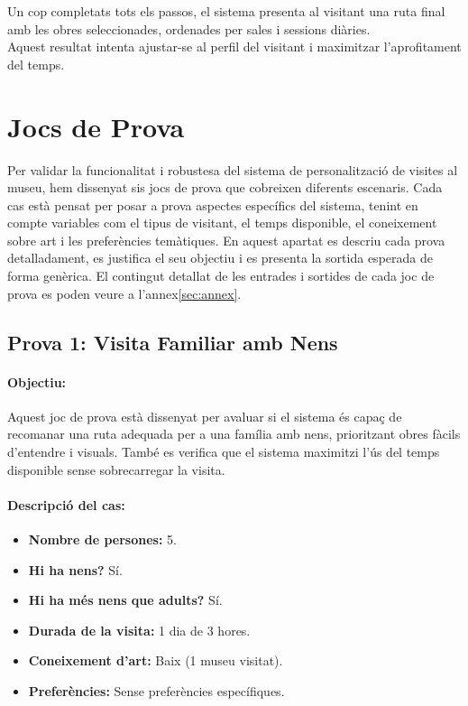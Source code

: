 \documentclass[a4paper]{article}
\begin{document}
	Un cop completats tots els passos, el sistema presenta al visitant una ruta final amb les obres seleccionades, ordenades per sales i sessions diàries. \\
	
	Aquest resultat intenta ajustar-se al perfil del visitant i maximitzar l’aprofitament del temps.
	
	
	\newpage
	\section{Jocs de Prova}
	
	Per validar la funcionalitat i robustesa del sistema de personalització de visites al museu, hem dissenyat sis jocs de prova que cobreixen diferents escenaris. Cada cas està pensat per posar a prova aspectes específics del sistema, tenint en compte variables com el tipus de visitant, el temps disponible, el coneixement sobre art i les preferències temàtiques. En aquest apartat es descriu cada prova detalladament, es justifica el seu objectiu i es presenta la sortida esperada de forma genèrica. El contingut detallat de les entrades i sortides de cada joc de prova es poden veure a l'annex\ref{sec:annex}.
	
	\subsection{Prova 1: Visita Familiar amb Nens}
	
	\paragraph{Objectiu:} 
	Aquest joc de prova està dissenyat per avaluar si el sistema és capaç de recomanar una ruta adequada per a una família amb nens, prioritzant obres fàcils d’entendre i visuals. També es verifica que el sistema maximitzi l’ús del temps disponible sense sobrecarregar la visita.
	
	\paragraph{Descripció del cas:} 
	
	\begin{itemize}
		\item \textbf{Nombre de persones:} 5.
		\item \textbf{Hi ha nens?} Sí.
		\item \textbf{Hi ha més nens que adults?} Sí.
		\item \textbf{Durada de la visita:} 1 dia de 3 hores.
		\item \textbf{Coneixement d’art:} Baix (1 museu visitat).
		\item \textbf{Preferències:} Sense preferències específiques.
	\end{itemize}
	
\end{document}
